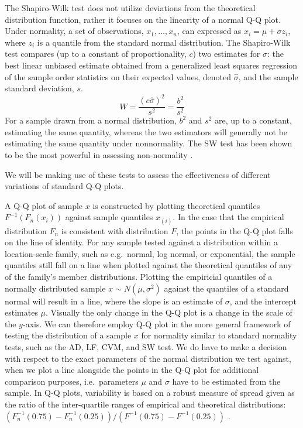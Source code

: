 \documentclass{article}\usepackage[]{graphicx}\usepackage[]{color}
\newcommand{\hh}[1]{{\color{magenta} #1}}
\newcommand{\al}[1]{{\color{red} #1}}
\begin{document}
\al{The Shapiro-Wilk test \cite[SW-test][]{Shapiro:1965kt} does not utilize deviations from the theoretical distribution function, rather it focuses on the linearity of a normal Q-Q plot. Under normality, a set of observations, $x_1, \ldots, x_n$, can expressed as $x_i = \mu + \sigma z_i$, where $z_i$ is a quantile from the standard normal distribution. The Shapiro-Wilk test compares (up to a constant of proportionality, $c$) two estimates for $\sigma$: the best linear unbiased estimate obtained from a generalized least squares regression of the sample order statistics on their expected values, denoted $\widehat{\sigma}$, and the sample standard deviation, $s$.
\[
  W = \frac{(c \widehat{\sigma})^2}{s^2} = \frac{b^2}{s^2}
\]
For a sample drawn from a normal distribution, $b^2$ and $s^2$ are, up to a constant, estimating the same quantity, whereas the two estimators will generally not be estimating the same quantity under nonnormality. The SW test has been shown to be the most powerful in assessing non-normality \citep{stephens:1974, razali:2011}. }


We will be making use of these tests to assess the effectiveness of different variations of standard Q-Q plots.


 A Q-Q plot of sample $x$ is constructed by plotting theoretical quantiles $F^{-1}(F_n(x_i))$ against sample quantiles $x_{(i)}$. In the case that the empirical distribution $F_n$ is consistent with distribution $F$, the points in the Q-Q plot falls on the line of identity. 
For any sample tested against a distribution within a location-scale family, such as e.g.~normal, log normal, or exponential, the sample quantiles still fall on a line when plotted against the theoretical quantiles of any of the family's member distributions. Plotting the empiricial quantiles of a normally distributed sample $x \sim N(\mu, \sigma^2)$ against the quantiles of a standard normal will result in a line, where  the slope is an estimate of $\sigma$, and the intercept estimates $\mu$. Visually  the only change in the Q-Q plot is a  change in the scale of the $y$-axis. We can therefore employ Q-Q plot in the more general framework of testing the distribution of a sample $x$ for normality similar to standard normality tests, such as the AD, LF, CVM, and SW test. We do have to make a decision with respect to the exact parameters of the normal distribution we test against, when we plot a line alongside the points in the Q-Q plot for additional comparison purposes, i.e.~parameters $\mu$ and $\sigma$ have to be estimated from the sample. In Q-Q plots, variability is based on a robust measure of spread given as the ratio of the inter-quartile ranges of empirical and theoretical distributions: $\left(F^{-1}_n(0.75) - F^{-1}_n(0.25)\right) / \left(F^{-1}(0.75) - F^{-1}(0.25)\right)$ \citep[see e.g.~][\hh{p.~XXX}]{tukey:eda}. 
 
\end{document}
